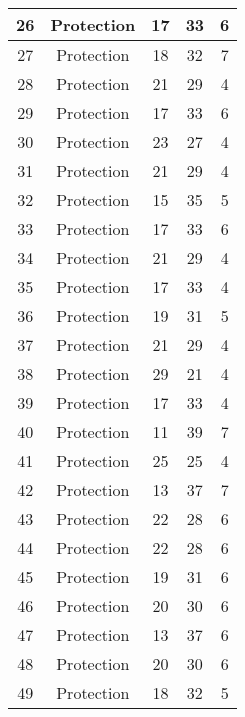 \documentclass[results.tex]{subfiles}
\begin{document}
\begin{center}
\begin{tabular}{| c || c | c | c | c |}
    \hline
    26 & Protection & 17 & 33 & 6 \\ 
    \hline
    27 & Protection & 18 & 32 & 7 \\ 
    \hline
    28 & Protection & 21 & 29 & 4 \\ 
    \hline
    29 & Protection & 17 & 33 & 6 \\ 
    \hline
    30 & Protection & 23 & 27 & 4 \\ 
    \hline
    31 & Protection & 21 & 29 & 4 \\ 
    \hline
    32 & Protection & 15 & 35 & 5 \\ 
    \hline
    33 & Protection & 17 & 33 & 6 \\ 
    \hline
    34 & Protection & 21 & 29 & 4 \\ 
    \hline
    35 & Protection & 17 & 33 & 4 \\ 
    \hline
    36 & Protection & 19 & 31 & 5 \\ 
    \hline
    37 & Protection & 21 & 29 & 4 \\ 
    \hline
    38 & Protection & 29 & 21 & 4 \\ 
    \hline
    39 & Protection & 17 & 33 & 4 \\ 
    \hline
    40 & Protection & 11 & 39 & 7 \\ 
    \hline
    41 & Protection & 25 & 25 & 4 \\ 
    \hline
    42 & Protection & 13 & 37 & 7 \\ 
    \hline
    43 & Protection & 22 & 28 & 6 \\ 
    \hline
    44 & Protection & 22 & 28 & 6 \\ 
    \hline
    45 & Protection & 19 & 31 & 6 \\ 
    \hline
    46 & Protection & 20 & 30 & 6 \\ 
    \hline
    47 & Protection & 13 & 37 & 6 \\ 
    \hline
    48 & Protection & 20 & 30 & 6 \\ 
    \hline
    49 & Protection & 18 & 32 & 5 \\ 
    \hline   \end{tabular}
\end{center}
\end{document}
